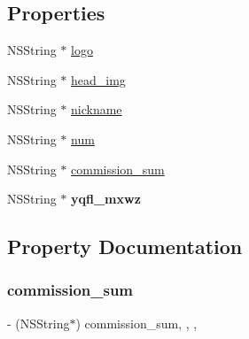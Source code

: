 \subsection*{Properties}
\begin{DoxyCompactItemize}
\item 
N\+S\+String $\ast$ \mbox{\hyperlink{interface_j_m_invite_friend_ranking_model_a72d18ffad49aa68c5bd1e865eaa2e215}{logo}}
\item 
N\+S\+String $\ast$ \mbox{\hyperlink{interface_j_m_invite_friend_ranking_model_ae8c37b781f3e44578b47a117bb682433}{head\+\_\+img}}
\item 
N\+S\+String $\ast$ \mbox{\hyperlink{interface_j_m_invite_friend_ranking_model_a3b61e9d0de9e983d605f95abcd41e02d}{nickname}}
\item 
N\+S\+String $\ast$ \mbox{\hyperlink{interface_j_m_invite_friend_ranking_model_a7c5bcbcde888978d9c1a5943c9382c21}{num}}
\item 
N\+S\+String $\ast$ \mbox{\hyperlink{interface_j_m_invite_friend_ranking_model_a37d53afc5f7e39877288c917777dabaa}{commission\+\_\+sum}}
\item 
\mbox{\label{interface_j_m_invite_friend_ranking_model_a3642716a8f3a8810b23c354a7a62354d}} 
N\+S\+String $\ast$ {\bfseries yqfl\+\_\+mxwz}
\end{DoxyCompactItemize}


\subsection{Property Documentation}
\mbox{\label{interface_j_m_invite_friend_ranking_model_a37d53afc5f7e39877288c917777dabaa}} 
\subsubsection{\texorpdfstring{commission\+\_\+sum}{commission\_sum}}
{\footnotesize\ttfamily -\/ (N\+S\+String$\ast$) commission\+\_\+sum\hspace{0.3cm}{\ttfamily [read]}, {\ttfamily [write]}, {\ttfamily [nonatomic]}, {\ttfamily [copy]}}


